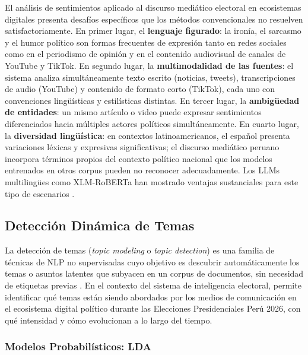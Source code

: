 El análisis de sentimientos aplicado al discurso mediático electoral en ecosistemas digitales presenta desafíos específicos que los métodos convencionales no resuelven satisfactoriamente. En primer lugar, el \textbf{lenguaje figurado}: la ironía, el sarcasmo y el humor político son formas frecuentes de expresión tanto en redes sociales como en el periodismo de opinión y en el contenido audiovisual de canales de YouTube y TikTok. En segundo lugar, la \textbf{multimodalidad de las fuentes}: el sistema analiza simultáneamente texto escrito (noticias, tweets), transcripciones de audio (YouTube) y contenido de formato corto (TikTok), cada uno con convenciones lingüísticas y estilísticas distintas. En tercer lugar, la \textbf{ambigüedad de entidades}: un mismo artículo o video puede expresar sentimientos diferenciados hacia múltiples actores políticos simultáneamente. En cuarto lugar, la \textbf{diversidad lingüística}: en contextos latinoamericanos, el español presenta variaciones léxicas y expresivas significativas; el discurso mediático peruano incorpora términos propios del contexto político nacional que los modelos entrenados en otros corpus pueden no reconocer adecuadamente. Los LLMs multilingües como XLM-RoBERTa han mostrado ventajas sustanciales para este tipo de escenarios \parencite{tec_conneau2020xlmr}.

\subsection{Detección Dinámica de Temas}

La detección de temas (\textit{topic modeling} o \textit{topic detection}) es una familia de técnicas de NLP no supervisadas cuyo objetivo es descubrir automáticamente los temas o asuntos latentes que subyacen en un corpus de documentos, sin necesidad de etiquetas previas \parencite{mc_blei2012lda}. En el contexto del sistema de inteligencia electoral, permite identificar qué temas están siendo abordados por los medios de comunicación en el ecosistema digital político durante las Elecciones Presidenciales Perú 2026, con qué intensidad y cómo evolucionan a lo largo del tiempo.

\subsubsection{Modelos Probabilísticos: LDA}

